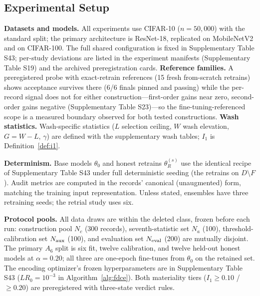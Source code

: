 \documentclass[lettersize,journal]{IEEEtran}
\begin{document}
\subsection{Experimental Setup}
\textbf{Datasets and models.} All experiments use CIFAR-10
($n{=}50{,}000$) with the standard
split; the primary architecture is ResNet-18, replicated on
MobileNetV2 and on CIFAR-100. The full shared configuration
is fixed in
Supplementary Table S43; per-study deviations are listed
in the experiment manifests (Supplementary Table S19) and the
archived preregistration cards. \textbf{Reference families.} A preregistered probe with
exact-retrain references (15 fresh from-scratch retrains)
shows acceptance survives there (6/6 finals pinned and
passing) while the per-record signal does not for either
construction---first-order gains near zero, second-order
gains negative (Supplementary Table S23)---so the
fine-tuning-referenced scope is a measured boundary observed
for both tested constructions. \textbf{Wash statistics.} Wash-specific
statistics
($L$ selection ceiling, $W$ wash elevation, $G = W - L$,
$\gamma$) are defined with the supplementary wash tables;
$I_1$ is Definition~\ref{def:i1}.

\textbf{Determinism.} Base models $\theta_0$ and honest retrains
$\theta_R^{(s)}$ use the identical recipe of
Supplementary Table S43 under full deterministic seeding
(the retrains on $D \setminus F$). Audit metrics are computed
in the records' canonical (unaugmented) form, matching the
training input representation. Unless stated, ensembles have
three retraining seeds; the retrial study uses six.

\textbf{Protocol pools.} All data draws are within the deleted class, frozen before
each run: construction pool $N_c$ (300 records),
seventh-statistic set $N_a$ (100), threshold-calibration set
$N_{\rm aux}$ (100), and evaluation set $N_{\rm eval}$ (200)
are mutually disjoint. The primary $A_6$ split is six fit,
twelve calibration, and twelve held-out honest models at
$\alpha{=}0.20$; all three are one-epoch fine-tunes from
$\theta_0$ on the retained set. The encoding optimizer's
frozen hyperparameters are in Supplementary Table S43
($LR_0{=}10^{-3}$ in Algorithm~\ref{alg:fdce}).
Both materiality tiers ($I_1 \ge 0.10$ / $\ge 0.20$) are
preregistered with three-state verdict rules.
\end{document}
